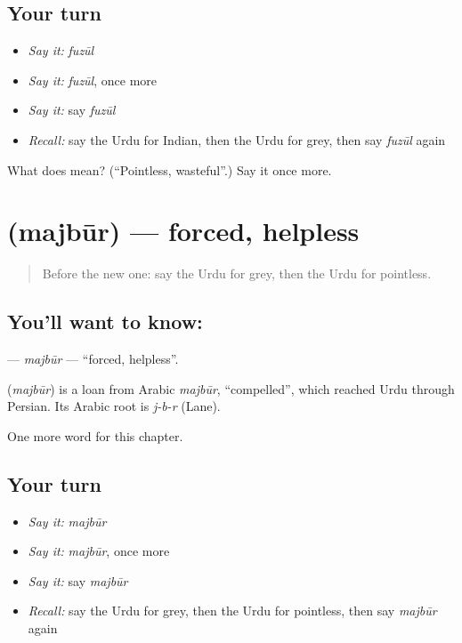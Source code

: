 \subsection*{Your turn}
\begin{itemize}
\raggedright
  \item \emph{Say it:} \emph{fuzūl}
  \item \emph{Say it:} \emph{fuzūl}, once more
  \item \emph{Say it:} say \emph{fuzūl}
  \item \emph{Recall:} say the Urdu for Indian, then the Urdu for grey, then say \emph{fuzūl} again
\end{itemize}

\begin{tcolorbox}[breakable,colback=teal!4,colframe=teal!35!black,title={Before you move on}]
What does  mean? (\textquotedblleft{}Pointless, wasteful\textquotedblright{}.) Say it once more.
\end{tcolorbox}
\section[\texorpdfstring{\ur{مجبور} (majbūr)}{مجبور (majbūr)}]{ (majbūr) — forced, helpless}

\label{lesson:UR-C163-majbur}



\begin{quote}
Before the new one: say the Urdu for grey, then the Urdu for pointless.
\end{quote}

\subsection*{You'll want to know: }
\textbf{} — \emph{majbūr} — \textquotedblleft{}forced, helpless\textquotedblright{}.

\begin{cousinweb}
\textbf{} (\emph{majbūr}) is a loan from Arabic \emph{majbūr}, \textquotedblleft{}compelled\textquotedblright{}, which reached Urdu through Persian. Its Arabic root is \emph{j-b-r} (Lane).
\end{cousinweb}

\begin{grammarlens}[title={What you've built}]
One more word for this chapter.
\end{grammarlens}

\subsection*{Your turn}
\begin{itemize}
\raggedright
  \item \emph{Say it:} \emph{majbūr}
  \item \emph{Say it:} \emph{majbūr}, once more
  \item \emph{Say it:} say \emph{majbūr}
  \item \emph{Recall:} say the Urdu for grey, then the Urdu for pointless, then say \emph{majbūr} again
\end{itemize}

